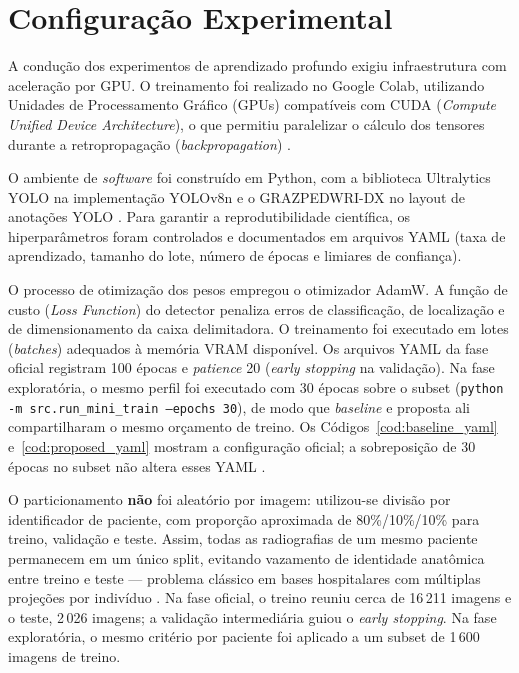 \documentclass[12pt,oneside,a4paper,chapter=TITLE,section=TITLE,sumario=tradicional]{abntex2}
\begin{document}
\section{Configuração Experimental}
\label{sec:configuracao_experimental}

A condução dos experimentos de aprendizado profundo exigiu infraestrutura com aceleração por GPU. O treinamento foi realizado no Google Colab, utilizando Unidades de Processamento Gráfico (GPUs) compatíveis com CUDA (\textit{Compute Unified Device Architecture}), o que permitiu paralelizar o cálculo dos tensores durante a retropropagação (\textit{backpropagation}) \cite{deeplearningbook2024,ibm2024}.

O ambiente de \textit{software} foi construído em Python, com a biblioteca Ultralytics YOLO na implementação YOLOv8n \cite{jocher2023ultralytics} e o GRAZPEDWRI-DX no layout de anotações YOLO \cite{nagy2022grazpedwri,redmon2016you}. Para garantir a reprodutibilidade científica, os hiperparâmetros foram controlados e documentados em arquivos YAML (taxa de aprendizado, tamanho do lote, número de épocas e limiares de confiança).

O processo de otimização dos pesos empregou o otimizador AdamW. A função de custo (\textit{Loss Function}) do detector penaliza erros de classificação, de localização e de dimensionamento da caixa delimitadora. O treinamento foi executado em lotes (\textit{batches}) adequados à memória VRAM disponível. Os arquivos YAML da fase oficial registram 100 épocas e \textit{patience} 20 (\textit{early stopping} na validação). Na fase exploratória, o mesmo perfil foi executado com 30 épocas sobre o subset (\texttt{python -m src.run\_mini\_train --epochs 30}), de modo que \textit{baseline} e proposta ali compartilharam o mesmo orçamento de treino. Os Códigos~\ref{cod:baseline_yaml} e~\ref{cod:proposed_yaml} mostram a configuração oficial; a sobreposição de 30 épocas no subset não altera esses YAML \cite{litjens2017survey}.

O particionamento \textbf{não} foi aleatório por imagem: utilizou-se divisão por identificador de paciente, com proporção aproximada de 80\%/10\%/10\% para treino, validação e teste. Assim, todas as radiografias de um mesmo paciente permanecem em um único split, evitando vazamento de identidade anatômica entre treino e teste --- problema clássico em bases hospitalares com múltiplas projeções por indivíduo \cite{nagy2022grazpedwri,litjens2017survey}. Na fase oficial, o treino reuniu cerca de 16\,211 imagens e o teste, 2\,026 imagens; a validação intermediária guiou o \textit{early stopping}. Na fase exploratória, o mesmo critério por paciente foi aplicado a um subset de 1\,600 imagens de treino.
\end{document}
